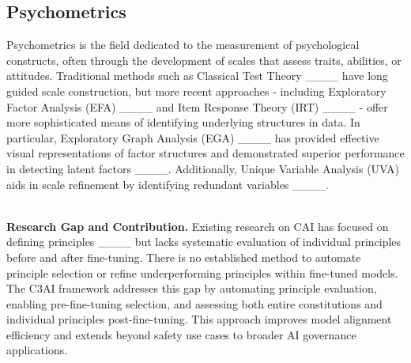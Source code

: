 \subsection{Psychometrics} 
Psychometrics is the field dedicated to the measurement of psychological constructs, often through the development of scales that assess traits, abilities, or attitudes. Traditional methods such as Classical Test Theory ____ have long guided scale construction, but more recent approaches - including Exploratory Factor Analysis (EFA) ____ and Item Response Theory (IRT) ____ - offer more sophisticated means of identifying underlying structures in data. In particular, Exploratory Graph Analysis (EGA) ____ has provided effective visual representations of factor structures and demonstrated superior performance in detecting latent factors ____. Additionally, Unique Variable Analysis (UVA) aids in scale refinement by identifying redundant variables ____. 



\mbox{ } \\
\textbf{Research Gap and Contribution.} Existing research on CAI has focused on defining principles ____ but lacks systematic evaluation of individual principles before and after fine-tuning. There is no established method to automate principle selection or refine underperforming principles within fine-tuned models. The C3AI framework addresses this gap by automating principle evaluation, enabling pre-fine-tuning selection, and assessing both entire constitutions and individual principles post-fine-tuning. This approach improves model alignment efficiency and extends beyond safety use cases to broader AI governance applications.
